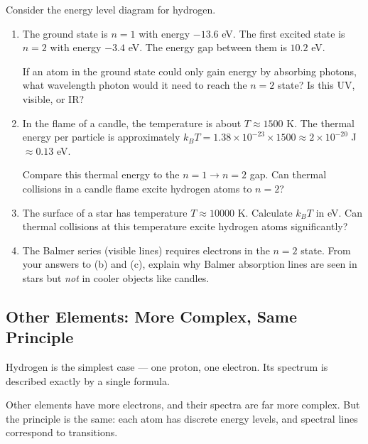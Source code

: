 \documentclass[12pt, a4paper]{book}
\begin{document}
\begin{puzzlebox}
Consider the energy level diagram for hydrogen.

\begin{enumerate}[label=(\alph*), leftmargin=*]
  \item The ground state is $n=1$ with energy $-13.6$ eV.
        The first excited state is $n=2$ with energy $-3.4$ eV.
        The energy gap between them is $10.2$ eV.

        If an atom in the ground state could only gain energy
        by absorbing photons, what wavelength photon would it need
        to reach the $n=2$ state?
        Is this UV, visible, or IR?

  \item In the flame of a candle, the temperature is about
        $T \approx 1500$ K.
        The thermal energy per particle is approximately
        $k_B T = 1.38\times10^{-23} \times 1500 \approx 2\times10^{-20}$ J
        $\approx 0.13$ eV.

        Compare this thermal energy to the $n=1 \to n=2$ gap.
        Can thermal collisions in a candle flame excite
        hydrogen atoms to $n=2$?

  \item The surface of a star has temperature $T \approx 10000$ K.
        Calculate $k_B T$ in eV.
        Can thermal collisions at this temperature excite
        hydrogen atoms significantly?

  \item The Balmer series (visible lines) requires electrons
        in the $n=2$ state.
        From your answers to (b) and (c), explain why
        Balmer absorption lines are seen in stars but
        \emph{not} in cooler objects like candles.
\end{enumerate}
\end{puzzlebox}

\subsection{Other Elements: More Complex, Same Principle}

Hydrogen is the simplest case --- one proton, one electron.
Its spectrum is described exactly by a single formula.

Other elements have more electrons, and their spectra are
far more complex.
But the principle is the same: each atom has discrete
energy levels, and spectral lines correspond to transitions.
\end{document}
